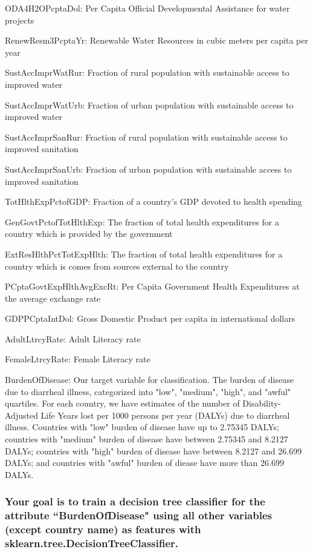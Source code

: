 \documentclass[11pt]{article}
\begin{document}
ODA4H2OPcptaDol: Per Capita Official Developmental Assistance for water
projects

RenewResm3PcptaYr: Renewable Water Resources in cubic meters per capita
per year

SustAccImprWatRur: Fraction of rural population with sustainable access
to improved water

SustAccImprWatUrb: Fraction of urban population with sustainable access
to improved water

SustAccImprSanRur: Fraction of rural population with sustainable access
to improved sanitation

SustAccImprSanUrb: Fraction of urban population with sustainable access
to improved sanitation

TotHlthExpPctofGDP: Fraction of a country's GDP devoted to health
spending

GenGovtPctofTotHlthExp: The fraction of total health expenditures for a
country which is provided by the government

ExtResHlthPctTotExpHlth: The fraction of total health expenditures for a
country which is comes from sources external to the country

PCptaGovtExpHlthAvgExcRt: Per Capita Government Health Expenditures at
the average exchange rate

GDPPCptaIntDol: Gross Domestic Product per capita in international
dollars

AdultLtrcyRate: Adult Literacy rate

FemaleLtrcyRate: Female Literacy rate

BurdenOfDisease: Our target variable for classification. The burden of
disease due to diarrheal illness, categorized into "low", "medium",
"high", and "awful" quartiles. For each country, we have estimates of
the number of Disability-Adjusted Life Years lost per 1000 persons per
year (DALYs) due to diarrheal illness. Countries with "low" burden of
disease have up to 2.75345 DALYs; countries with "medium" burden of
disease have between 2.75345 and 8.2127 DALYs; countries with "high"
burden of disease have between 8.2127 and 26.699 DALYs; and countries
with "awful" burden of diease have more than 26.699 DALYs.

    \subsubsection{Your goal is to train a decision tree classifier for the
attribute ``BurdenOfDisease" using all other variables (except country
name) as features with
sklearn.tree.DecisionTreeClassifier.}\label{your-goal-is-to-train-a-decision-tree-classifier-for-the-attribute-burdenofdisease-using-all-other-variables-except-country-name-as-features-with-sklearn.tree.decisiontreeclassifier.}
\end{document}
